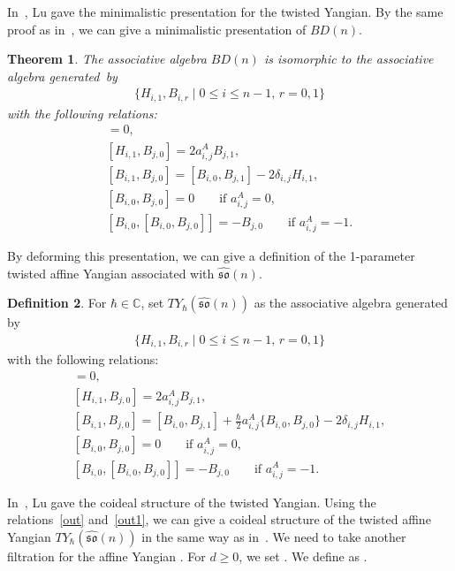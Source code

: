 \documentclass[pdftex]{sigma}
\numberwithin{equation}{section}
\newtheorem{Theorem}{Theorem}[section]
\theoremstyle{definition}
\newtheorem{Definition}[Theorem]{Definition}
\begin{document}
In~\cite{L}, Lu gave the minimalistic presentation for the twisted Yangian. By the same proof as in~\cite[Theorem~3.1]{L}, we can give a minimalistic presentation of $BD(n)$.
\begin{Theorem}
The associative algebra $BD(n)$ is isomorphic to the associative algebra generated~by
\begin{gather*}
\{H_{i,1},B_{i,r}\mid0\leq i\leq n-1,\,r=0,1\}
\end{gather*}
with the following relations:
\begin{gather*}
[H_{i,1},H_{j,1}]=0,\\
[H_{i,1},B_{j,0}]=2a^A_{i,j}B_{j,1},\\
[B_{i,1},B_{j,0}]=[B_{i,0},B_{j,1}]-2\delta_{i,j}H_{i,1},\\
[B_{i,0},B_{j,0}]=0\qquad \text{if }a^A_{i,j}=0,\\
[B_{i,0},[B_{i,0},B_{j,0}]]=-B_{j,0}\qquad \text{if }a^A_{i,j}=-1.
\end{gather*}
\end{Theorem}
By deforming this presentation, we can give a definition of the 1-parameter twisted affine Yangian associated with $\widehat{\mathfrak{so}}(n)$.
\begin{Definition}
For $\hbar\in\mathbb{C}$, set $TY_{\hbar}(\widehat{\mathfrak{so}}(n))$ as the associative algebra generated by
\begin{gather*}
\{H_{i,1},B_{i,r}\mid0\leq i\leq n-1,\,r=0,1\}
\end{gather*}
with the following relations:
\begin{gather*}
[H_{i,1},H_{j,1}]=0,\\
[H_{i,1},B_{j,0}]=2a^A_{i,j}B_{j,1},\\
[B_{i,1},B_{j,0}]=[B_{i,0},B_{j,1}]+\frac{\hbar}{2}a^A_{i,j}\{B_{i,0},B_{j,0}\}-2\delta_{i,j}H_{i,1},\\
[B_{i,0},B_{j,0}]=0\qquad \text{if }a^A_{i,j}=0,\\
[B_{i,0},[B_{i,0},B_{j,0}]]=-B_{j,0}\qquad \text{if }a^A_{i,j}=-1.
\end{gather*}
\end{Definition}
In~\cite{L}, Lu gave the coideal structure of the twisted Yangian. Using the relations~\eqref{out} and~\eqref{out1}, we can give a coideal structure of the twisted affine Yangian $TY_{\hbar}(\widehat{\mathfrak{so}}(n))$ in the same way as in~\cite[Theorem~4.1]{L}. We need to take another filtration for the affine Yangian . For $d\geq0$, we set . We define  as .
\end{document}
